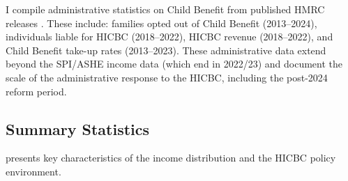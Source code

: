 \documentclass[12pt]{article}
\begin{document}
I compile administrative statistics on Child Benefit from published HMRC releases \citep{hmrc2023}. These include: families opted out of Child Benefit (2013--2024), individuals liable for HICBC (2018--2022), HICBC revenue (2018--2022), and Child Benefit take-up rates (2013--2023). These administrative data extend beyond the SPI/ASHE income data (which end in 2022/23) and document the scale of the administrative response to the HICBC, including the post-2024 reform period.

\subsection{Summary Statistics}

 presents key characteristics of the income distribution and the HICBC policy environment.
\end{document}
